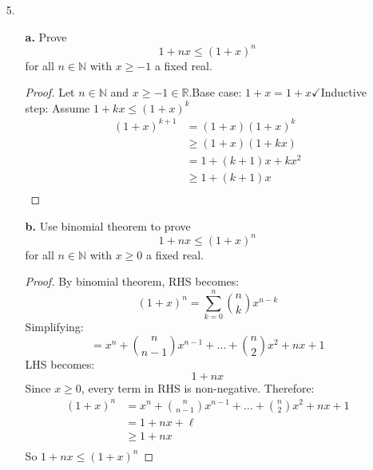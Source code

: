 \documentclass[hidelinks,12pt]{article}
\renewcommand{\geq}{\geqslant}
\renewcommand{\leq}{\leqslant}
\newcommand{\R}{\mathbb{R}}
\newcommand{\N}{\mathbb{N}}
\begin{document}
\begin{itemize}
\begin{enumerate}
\begin{proof}
        \end{proof}
    \end{enumerate}
    \item[5.]\begin{enumerate}
        \item[\bf{a.}]Prove $$1+nx\leq(1+x)^n$$ for all $n\in\N$ with $x\geq-1$ a fixed real.\begin{proof}
            Let $n\in\N$ and $x\geq-1\in\R$.\newline Base case: $1+x=1+x\checkmark$\newline Inductive step: Assume $1+kx\leq(1+x)^k$
            \begin{align*}
                (1+x)^{k+1}&=(1+x)(1+x)^k\\
                &\geq(1+x)(1+kx)\\
                &=1+(k+1)x+kx^2\\
                &\geq1+(k+1)x\\
            \end{align*}
        \end{proof}
        \item[\bf{b.}] Use binomial theorem to prove $$1+nx\leq(1+x)^n$$ for all $n\in\N$ with $x\geq0$ a fixed real.\begin{proof}
            By binomial theorem, RHS becomes: $$(1+x)^n=\sum_{k=0}^n\binom{n}{k}x^{n-k}$$ Simplifying: $$=x^n+\binom{n}{n-1}x^{n-1}+\dots+\binom{n}{2}x^2+nx+1$$ LHS becomes: $$1+nx$$ Since $x\geq0$, every term in RHS is non-negative. Therefore:\begin{align*}
                (1+x)^n&=x^n+\binom{n}{n-1}x^{n-1}+\dots+\binom{n}{2}x^2+nx+1\\
                &=1+nx+\ell\\
                &\geq1+nx\\
            \end{align*} So $1+nx\leq(1+x)^n$
        \end{proof}
    \end{enumerate}
\end{itemize}
\end{document}
